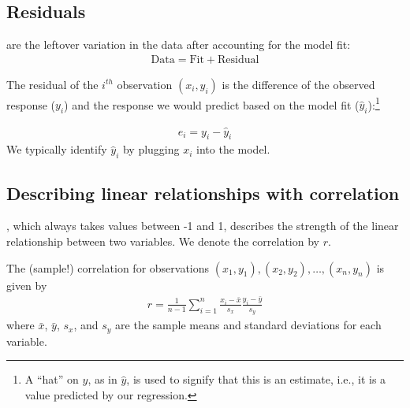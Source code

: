 \subsection{Residuals}


 are the leftover variation in the data after accounting for the model fit:
\begin{align*}
\text{Data} = \text{Fit} + \text{Residual}
\end{align*}

\begin{termBox}{
The residual of the $i^{th}$ observation $(x_i, y_i)$ is the difference of the observed response ($y_i$) and the response we would predict based on the model fit ($\hat{y}_i$):\footnote{A ``hat'' on $y$, as in $\hat y$, is used to signify that this is an estimate, i.e., it is a value predicted by our regression.}

\begin{eqnarray*}
e_i = y_i - \hat{y}_i
\end{eqnarray*}
We typically identify $\hat{y}_i$ by plugging $x_i$ into the model.}
\end{termBox}




\subsection{Describing linear relationships with correlation}


\begin{termBox}{
, which always takes values between -1 and 1, describes the strength of the linear relationship between two variables. We denote the correlation by $r$.}
\end{termBox}

The (sample!) correlation for observations $(x_1, y_1), (x_2, y_2), \dots, (x_n, y_n)$ is given by
\begin{eqnarray*}
r = \frac{1}{n-1}\sum_{i=1}^{n} \frac{x_i-\bar{x}}{s_x}\frac{y_i-\bar{y}}{s_y}
\end{eqnarray*}
where $\bar{x}$, $\bar{y}$, $s_x$, and $s_y$ are the sample means and standard deviations for each variable.



